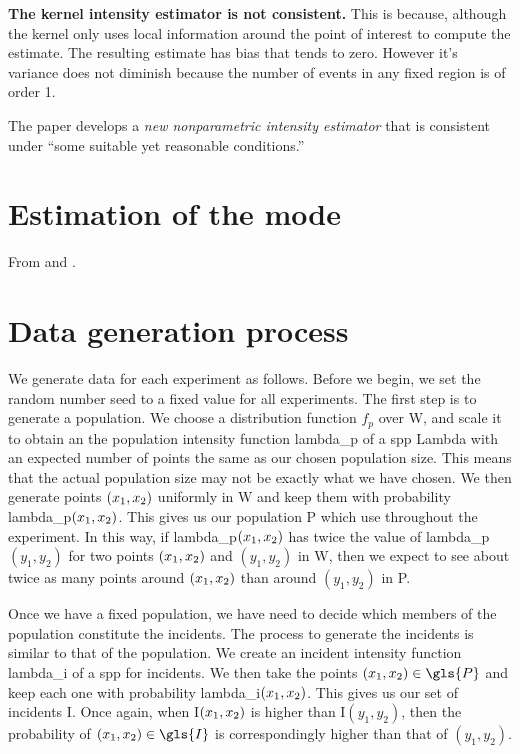 {
\color{red}
\textbf{The kernel intensity estimator is not consistent.}
This is because, although the kernel only uses local information around the point of interest to compute the estimate.
The resulting estimate has bias that tends to zero.
However it's variance does not diminish because the number of events in any fixed region is of order 1.
}

The paper develops a \textit{new nonparametric intensity estimator} that is consistent under ``some suitable yet reasonable conditions.''

\section{Estimation of the mode}
\label{sec:theory:mode}

From \citet{bickel2006fast} and \citet{hedges2003comparison}.


\section{Data generation process}
\label{sec:theory:data}

We generate data for each experiment as follows.
Before we begin, we set the random number seed to a fixed value for all experiments.
The first step is to generate a population.
We choose a distribution function $f_p$ over \gls{W}, and scale it to obtain an the population intensity function \gls{lambda_p} of a \gls{spp} \gls{Lambda} with an expected number of points the same as our chosen population size.
This means that the actual population size may not be exactly what we have chosen.
We then generate points $(x_1, x_2)$ uniformly in \gls{W} and keep them with probability \gls{lambda_p}$(x_1, x_2)$.
This gives us our population \gls{P} which use throughout the experiment.
In this way,
if \gls{lambda_p}$(x_1, x_2)$ has twice the value of \gls{lambda_p}$(y_1, y_2)$ for two points $(x_1, x_2)$ and $(y_1, y_2)$ in \gls{W},
then we expect to see about twice as many points around $(x_1, x_2)$ than around $(y_1, y_2)$ in \gls{P}.

Once we have a fixed population, we have need to decide which members of the population constitute the incidents.
The process to generate the incidents is similar to that of the population.
We create an incident intensity function \gls{lambda_i} of a \gls{spp} for incidents.
We then take the points $\xvec \in \gls{P}$ and keep each one with probability \gls{lambda_i}$(x_1, x_2)$.
This gives us our set of incidents \gls{I}.
Once again, when \gls{I}$(x_1, x_2)$ is higher than \gls{I}$(y_1, y_2)$,
then the probability of $\xvec \in \gls{I}$ is correspondingly higher than that of $(y_1, y_2)$.